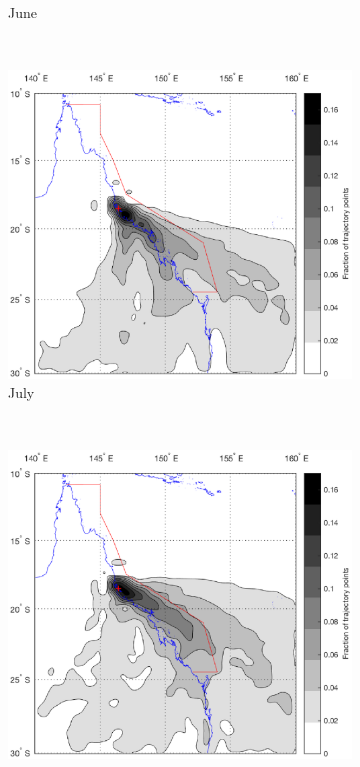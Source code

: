 \begin{figure}[!t]
\begin{subfigure}[b]{0.45\textwidth}
	    \caption{June}
	    \label{subfig:cair}
    \end{subfigure}
	\\
    \begin{subfigure}[b]{0.45\textwidth}
	    \includegraphics[width=\textwidth]{Fig/Research/BT_Coast/Map_075.eps}
	    \caption{July}
	    \label{subfig:cair}
    \end{subfigure}
    ~
    \begin{subfigure}[b]{0.45\textwidth}
	    \includegraphics[width=\textwidth]{Fig/Research/BT_Coast/Map_085.eps}

\end{subfigure}
\end{figure}
